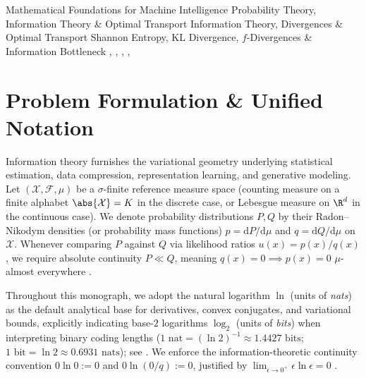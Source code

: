 \documentclass[../../../../master.tex]{subfiles}
\begin{document}
\monographleaf
  {Mathematical Foundations for Machine Intelligence}
  {Probability Theory, Information Theory \& Optimal Transport}
  {Information Theory, Divergences \& Optimal Transport}
  {Shannon Entropy, KL Divergence, $f$-Divergences \& Information Bottleneck}
  {, , , , }

\section{Problem Formulation \& Unified Notation}
\label{sec:infotheory:formulation}

Information theory furnishes the variational geometry underlying statistical estimation, data compression, representation learning, and generative modeling. Let $(\mathcal{X}, \mathcal{F}, \mu)$ be a $\sigma$-finite reference measure space (counting measure on a finite alphabet $\abs{\mathcal{X}} = K$ in the discrete case, or Lebesgue measure on $\R^d$ in the continuous case). We denote probability distributions $P, Q$ by their Radon--Nikodym densities (or probability mass functions) $p = \mathrm{d}P / \mathrm{d}\mu$ and $q = \mathrm{d}Q / \mathrm{d}\mu$ on $\mathcal{X}$. Whenever comparing $P$ against $Q$ via likelihood ratios $u(x) = p(x)/q(x)$, we require absolute continuity $P \ll Q$, meaning $q(x) = 0 \implies p(x) = 0$ $\mu$-almost everywhere  .

Throughout this monograph, we adopt the natural logarithm $\ln$ (units of \emph{nats}) as the default analytical base for derivatives, convex conjugates, and variational bounds, explicitly indicating base-$2$ logarithms $\log_2$ (units of \emph{bits}) when interpreting binary coding lengths ($1\text{ nat} = (\ln 2)^{-1} \approx 1.4427\text{ bits}$; $1\text{ bit} = \ln 2 \approx 0.6931\text{ nats}$); see . We enforce the information-theoretic continuity convention $0 \ln 0 := 0$ and $0 \ln(0/q) := 0$, justified by $\lim_{\epsilon \to 0^+} \epsilon \ln \epsilon = 0$  .
\end{document}

